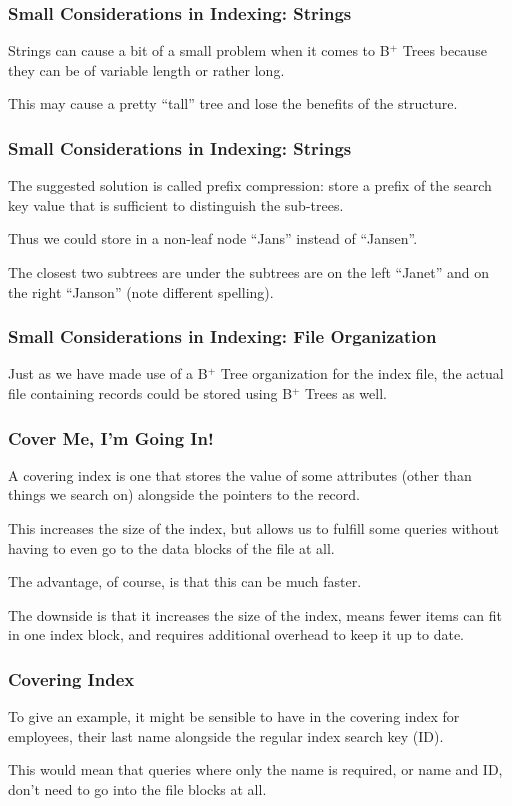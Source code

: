 \begin{frame}
\frametitle{Small Considerations in Indexing: Strings}

Strings can cause a bit of a small problem when it comes to B$^{+}$ Trees because they can be of variable length or rather long. 

This may cause a pretty ``tall'' tree and lose the benefits of the structure. 

\end{frame}

\begin{frame}
\frametitle{Small Considerations in Indexing: Strings}


The suggested solution is called prefix compression: store a prefix of the search key value that is sufficient to distinguish the sub-trees. 

Thus we could store in a non-leaf node ``Jans'' instead of ``Jansen''. 

The closest two subtrees are under the subtrees are on the left ``Janet'' and on the right ``Janson'' (note different spelling).

\end{frame}

\begin{frame}
\frametitle{Small Considerations in Indexing: File Organization}

Just as we have made use of a B$^{+}$ Tree organization for the index file, the actual file containing records could be stored using B$^{+}$ Trees as well.

\end{frame}


\begin{frame}
\frametitle{Cover Me, I'm Going In!}

A \alert{covering index} is one that stores the value of some attributes (other than things we search on) alongside the pointers to the record. 

This increases the size of the index, but allows us to fulfill some queries without having to even go to the data blocks of the file at all. 

The advantage, of course, is that this can be much faster. 

The downside is that it increases the size of the index, means fewer items can fit in one index block, and requires additional overhead to keep it up to date.


\end{frame}

\begin{frame}
\frametitle{Covering Index}

To give an example, it might be sensible to have in the covering index for employees, their last name alongside the regular index search key (ID). 

This would mean that queries where only the name is required, or name and ID, don't need to go into the file blocks at all.

\end{frame}

